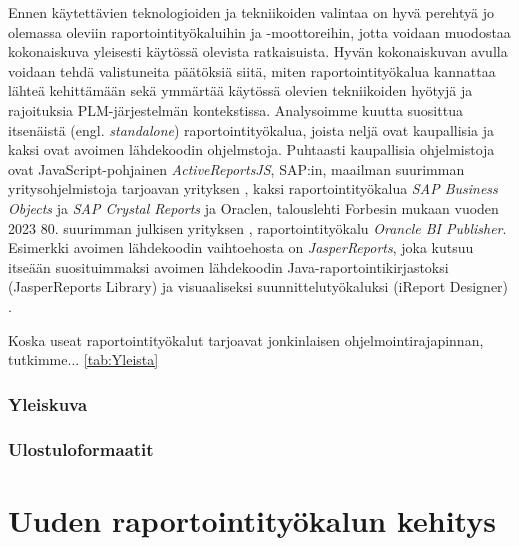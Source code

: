 Ennen käytettävien teknologioiden ja tekniikoiden valintaa on hyvä perehtyä jo olemassa oleviin raportointityökaluihin ja -moottoreihin, jotta voidaan muodostaa kokonaiskuva yleisesti käytössä olevista ratkaisuista. Hyvän kokonaiskuvan avulla voidaan tehdä valistuneita päätöksiä siitä, miten raportointityökalua kannattaa lähteä kehittämään sekä ymmärtää käytössä olevien tekniikoiden hyötyjä ja rajoituksia PLM-järjestelmän kontekstissa. Analysoimme kuutta suosittua itsenäistä (engl. \textit{standalone}) raportointityökalua, joista neljä ovat kaupallisia ja kaksi ovat avoimen lähdekoodin ohjelmstoja. Puhtaasti kaupallisia ohjelmistoja ovat JavaScript-pohjainen \textit{ActiveReportsJS}, SAP:in, maailman suurimman yritysohjelmistoja tarjoavan yrityksen \cite{noauthor_sap_nodate}, kaksi raportointityökalua \textit{SAP Business Objects} ja \textit{SAP Crystal Reports} ja Oraclen, talouslehti Forbesin mukaan vuoden 2023 80. suurimman julkisen yrityksen \cite{tucker_global_nodate}, raportointityökalu \textit{Orancle BI Publisher}. Esimerkki avoimen lähdekoodin vaihtoehosta on \textit{JasperReports}, joka kutsuu itseään suosituimmaksi avoimen lähdekoodin Java-raportointikirjastoksi (JasperReports Library) ja visuaaliseksi suunnittelutyökaluksi (iReport Designer) \cite{noauthor_jasperreports_nodate}.

Koska useat raportointityökalut tarjoavat jonkinlaisen ohjelmointirajapinnan, tutkimme... \ref{tab:Yleista}

\subsubsection{Yleiskuva}

\subsubsection{Ulostuloformaatit}

\section{Uuden raportointityökalun kehitys}

